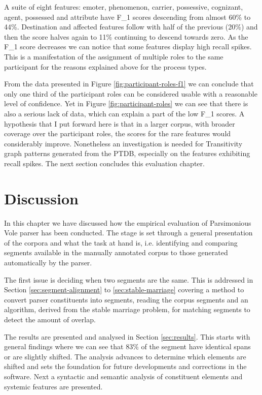     A suite of eight features: emoter, phenomenon, carrier, possessive, cognizant, agent, possessed and attribute have F_1 scores descending from almost 60\% to 44\%. Destination and affected features follow with half of the previous (20\%) and then the score halves again to 11\% continuing to descend towards zero. As the F_1 score decreases we can notice that some features display high recall spikes. This is a manifestation of the assignment of multiple roles to the same participant for the reasons explained above for the process types. 

    From the data presented in Figure \ref{fig:participant-roles-f1} we can conclude that only one third of the participant roles can be considered usable with a reasonable level of confidence. Yet in Figure \ref{fig:participant-roles} we can see that there is also a serious lack of data, which can explain a part of the low F_1 scores. A hypothesis that I put forward here is that in a larger corpus, with broader coverage over the participant roles, the scores for the rare features would considerably improve. Nonetheless an investigation is needed for Transitivity graph patterns generated from the PTDB, especially on the features exhibiting recall spikes. The next section concludes this evaluation chapter.

\section{Discussion}
\label{sec:evaluation-discussion}
    In this chapter we have discussed how the empirical evaluation of Parsimonious Vole parser has been conducted. The stage is set through a general presentation of the corpora and what the task at hand is, i.e. identifying and comparing segments available in the manually annotated corpus to those generated automatically by the parser. 

    The first issue is deciding when two segments are the same. This is addressed in Section \ref{sec:segment-alignment} to \ref{sec:stable-marriage} covering a method to convert parser constituents into segments, reading the corpus segments and an algorithm, derived from the stable marriage problem, for matching segments  to detect the amount of overlap.

    The results are presented and analysed in Section \ref{sec:results}. This starts with general findings where we can see that 83\% of the segment have identical spans or are slightly shifted. The analysis advances to determine which elements are shifted and sets the foundation for future developments and corrections in the software. Next a syntactic and semantic analysis of constituent elements and systemic features are presented. 

